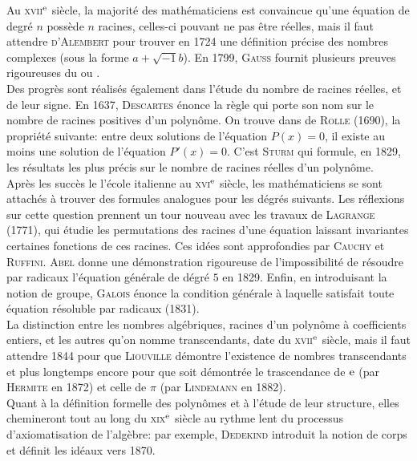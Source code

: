 {Au \textsc{xvii}$^{\mathrm{e}}$ siècle, la majorité des mathématiciens est convaincue qu'une équation de degré $n$ possède $n$ racines, celles-ci pouvant ne pas être réelles, mais il faut attendre \textsc{d'Alembert} pour trouver en 1724 une définition précise des nombres complexes (sous la forme $a + \sqrt{-1} b$). En 1799, \textsc{Gauss} fournit plusieurs preuves rigoureuses du  ou . \\
Des progrès sont réalisés également dans l'étude du nombre de racines réelles, et de leur signe. En 1637, \textsc{Descartes} énonce la règle qui porte son nom sur le nombre de racines positives d'un polynôme. On trouve dans  de \textsc{Rolle} (1690), la propriété suivante: entre deux solutions de l'équation $P(x)=0$, il existe au moins une solution de l'équation $P'(x)=0$. C'est \textsc{Sturm} qui formule, en 1829, les résultats les plus précis sur le nombre de racines réelles d'un polynôme. \\
Après les succès le l'école italienne au \textsc{xvi}$^{\mathrm{e}}$ siècle, les mathématiciens se sont attachés à trouver des formules analogues pour les dégrés suivants. Les réflexions sur cette question prennent un tour nouveau avec les travaux de \textsc{Lagrange} (1771), qui étudie les permutations des racines d'une équation laissant invariantes certaines fonctions de ces racines. Ces idées sont approfondies par \textsc{Cauchy} et \textsc{Ruffini}. \textsc{Abel} donne une démonstration rigoureuse de l'impossibilité de résoudre par radicaux l'équation générale de dégré $5$ en 1829. Enfin, en introduisant la notion de groupe, \textsc{Galois} énonce la condition générale à laquelle satisfait toute équation résoluble par radicaux (1831). \\
La distinction entre les nombres algébriques, racines d'un polynôme à coefficients entiers, et les autres qu'on nomme transcendants, date du \textsc{xvii}$^{\mathrm{e}}$ siècle, mais il faut attendre 1844 pour que \textsc{Liouville} démontre l'existence de nombres transcendants et plus longtemps encore pour que soit démontrée le trascendance de $\mathrm{e}$ (par \textsc{Hermite} en 1872) et celle de $\pi$ (par \textsc{Lindemann} en 1882). \\
Quant à la définition formelle des polynômes et à l'étude de leur structure, elles chemineront tout au long du \textsc{xix}$^{\mathrm{e}}$ siècle au rythme lent du processus d'axiomatisation de l'algèbre: par exemple, \textsc{Dedekind} introduit la notion de corps et définit les idéaux vers 1870.
}